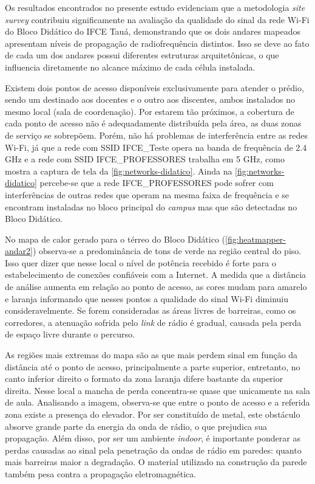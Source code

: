 Os resultados encontrados no presente estudo evidenciam que a metodologia \textit{site survey} contribuiu significamente na avaliação da qualidade do sinal da rede Wi-Fi do Bloco Didático do IFCE Tauá, demonstrando que os dois andares mapeados apresentam níveis de propagação de radiofrequência distintos. Isso se deve ao fato de cada um dos andares possui diferentes estruturas arquitetônicas, o que influencia diretamente no alcance máximo de cada célula instalada.
	
Existem dois pontos de acesso disponíveis exclusivamente para atender o prédio, sendo um destinado aos docentes e o outro aos discentes, ambos instalados no mesmo local (sala de coordenação). Por estarem tão próximos, a cobertura de cada ponto de acesso não é adequadamente distribuída pela área, as duas zonas de serviço se sobrepõem. Porém, não há problemas de interferência entre as redes Wi-Fi, já que a rede com SSID IFCE\_Teste opera na banda de frequência de 2.4 GHz e a rede com SSID IFCE\_PROFESSORES trabalha em 5 GHz, como mostra a captura de tela da \autoref{fig:networks-didatico}. Ainda na \autoref{fig:networks-didatico} percebe-se que a rede IFCE\_PROFESSORES pode sofrer com interferências de outras redes que operam na mesma faixa de frequência e se encontram instaladas no bloco principal do \textit{campus} mas que são detectadas no Bloco Didático.

No mapa de calor gerado para o térreo do Bloco Didático (\autoref{fig:heatmapper-andar2}) observa-se a predominância de tons de verde na região central do piso. Isso quer dizer que nesse local o nível de potência recebido é forte para o estabelecimento de conexões confiáveis com a Internet. A medida que a distância de análise aumenta em relação ao ponto de acesso, as cores mudam para amarelo e laranja informando que nesses pontos a qualidade do sinal Wi-Fi diminuiu consideravelmente. Se forem consideradas as áreas livres de barreiras, como os corredores, a atenuação sofrida pelo \textit{link} de rádio é gradual, causada pela perda de espaço livre durante o percurso. 

As regiões mais extremas do mapa são as que mais perdem sinal em função da distância até o ponto de acesso, principalmente a parte superior, entretanto, no canto inferior direito o formato da zona laranja difere bastante da superior direita. Nesse local a mancha de perda concentra-se quase que unicamente na sala de aula. Analisando a imagem, observa-se que entre o ponto de acesso e a referida zona existe a presença do elevador. Por ser constituído de metal, este obstáculo absorve grande parte da energia da onda de rádio, o que prejudica sua propagação. Além disso, por ser um ambiente \textit{indoor}, é importante ponderar as perdas causadas ao sinal pela penetração da ondas de rádio em paredes: quanto mais barreiras maior a degradação. O material utilizado na construção da parede também pesa contra a propagação eletromagnética.

